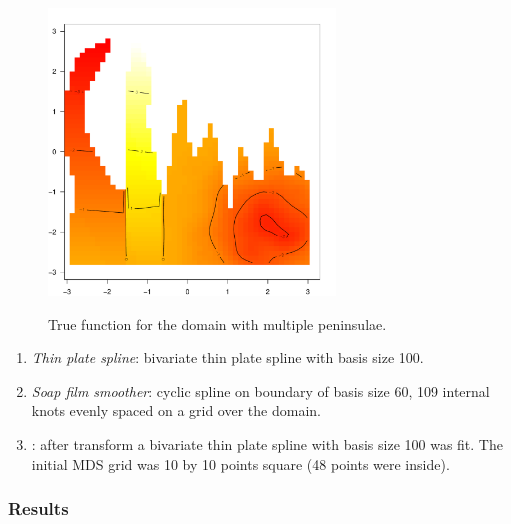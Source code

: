 {%
\begin{figure}
\centering
\includegraphics[width=3in]{mds/figs/wt2-truth.pdf} \\
\caption{True function for the domain with multiple peninsulae.}
\label{wt2-truth}
\end{figure}

\begin{enumerate}
\item \emph{Thin plate spline}: bivariate thin plate spline with basis size 100. 
\item \emph{Soap film smoother}: cyclic spline on boundary of basis size 60, 109 internal knots evenly spaced on a grid over the domain.
\item \emph{\mdsap}: after transform a bivariate thin plate spline with basis size 100 was fit. The initial MDS grid was 10 by 10 points square (48 points were inside).
\end{enumerate} 

\subsubsection{Results}

}
